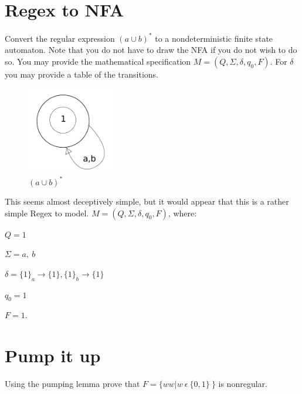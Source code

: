 \documentclass[10pt,reqno,sumlimits]{amsart}
\theoremstyle{plain}
\theoremstyle{definition}
\newcommand{\1}{{\bf 1}}
\numberwithin{equation}{section}
\begin{document}
\section{Regex to NFA}
Convert the regular expression $(a \cup b)^*$ to a nondeterministic finite state automaton. Note that you do not have to draw the NFA if you do not wish to do so. You may provide the mathematical specification $M = (Q, \Sigma, \delta, q_0 , F )$. For $\delta$ you may provide a table of the transitions.

\begin{figure}[htbp]
\centerline{
    \mbox{\includegraphics[width=1.5in]{algorithms2_3.pdf}}
  }
  \caption{$(a \cup b)^*$}
  \label{fig:fit}
\end{figure}

\hspace{0.5in} This seems almost deceptively simple, but it would appear that this is a rather simple Regex to model. $M = (Q, \Sigma, \delta, q_0 , F )$, where:

\vspace{0.2in}
$ Q = 1$

$\Sigma = a,\ b$

$\delta = \{1\}_a \rightarrow \{1\}, \{1\}_b \rightarrow \{1\}$

$q_0 = 1$

$F = 1$.
\vspace{0.2in}

\section{Pump it up}
Using the pumping lemma prove that $F = \{ww|w\  \epsilon\  \{0, 1\}\ \}$ is nonregular.
\end{document}
